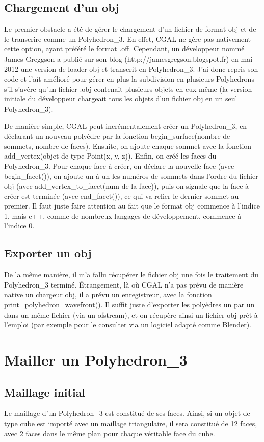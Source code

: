 \documentclass[a4paper,french]{report}
\begin{document}
			\subsection{Chargement d'un obj}
				Le premier obstacle a été de gérer le chargement d'un fichier de format obj et de le transcrire comme un Polyhedron\_3. En effet, CGAL ne gère pas nativement cette option, ayant préféré le format .off. Cependant, un développeur nommé James Greggson a publié sur son blog (http://jamesgregson.blogspot.fr) en mai 2012 une version de loader obj et transcrit en Polyhedron\_3. J'ai donc repris son code et l'ait amélioré pour gérer en plus la subdivision en plusieurs Polyhedrons s'il s'avère qu'un fichier .obj contenait plusieurs objets en eux-même (la version initiale du développeur chargeait tous les objets d'un fichier obj en un seul Polyhedron\_3). \par 
				De manière simple, CGAL peut incrémentalement créer un Polyhedron\_3, en déclarant un nouveau polyèdre par la fonction begin\_surface(nombre de sommets, nombre de faces). Ensuite, on ajoute chaque sommet avec la fonction add\_vertex(objet de type Point(x, y, z)). Enfin, on créé les faces du Polyhedron\_3. Pour chaque face à créer, on déclare la nouvelle face (avec begin\_facet()), on ajoute un à un les numéros de sommets dans l'ordre du fichier obj (avec add\_vertex\_to\_facet(num de la face)), puis on signale que la face à créer est terminée (avec end\_facet()), ce qui va relier le dernier sommet au premier. Il faut juste faire attention au fait que le format obj commence à l'indice 1, mais c++, comme de nombreux langages de développement, commence à l'indice 0.
			
			\subsection{Exporter un obj}
				De la même manière, il m'a fallu récupérer le fichier obj une fois le traitement du Polyhedron\_3 terminé. Étrangement, là où CGAL n'a pas prévu de manière native un chargeur obj, il a prévu un enregistreur, avec la fonction print\_polyhedron\_wavefront(). Il suffit juste d'exporter les polyèdres un par un dans un même fichier (via un ofstream), et on récupère ainsi un fichier obj prêt à l'emploi (par exemple pour le consulter via un logiciel adapté comme Blender).
		\section{Mailler un Polyhedron\_3}
			\subsection{Maillage initial}
				Le maillage d'un Polyhedron\_3 est constitué de ses faces. Ainsi, si un objet de type cube est importé avec un maillage triangulaire, il sera constitué de 12 faces, avec 2 faces dans le même plan pour chaque véritable face du cube.
\end{document}
